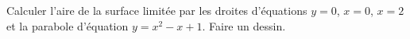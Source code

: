 
\begin{exercice}\label{exomazhe-0008}

	Calculer l'aire de la surface limitée par les droites d'équations $y=0$, $x=0$, $x=2$ et la parabole d'équation $y=x^2-x+1$. Faire un dessin.

\end{exercice}
